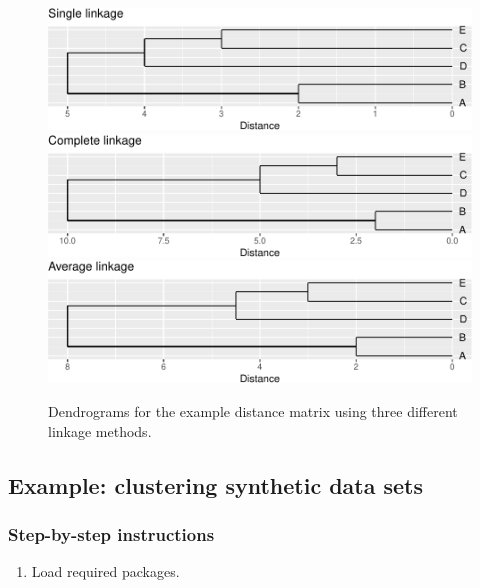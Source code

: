 \documentclass[]{book}
\providecommand{\tightlist}{%
  \setlength{\itemsep}{0pt}\setlength{\parskip}{0pt}}
\theoremstyle{definition}
\theoremstyle{definition}
\theoremstyle{definition}
\theoremstyle{remark}
\begin{document}
\begin{figure}

{\centering \includegraphics[width=1\linewidth]{09-clustering_files/figure-latex/linkageComparison-1} \includegraphics[width=1\linewidth]{09-clustering_files/figure-latex/linkageComparison-2} \includegraphics[width=1\linewidth]{09-clustering_files/figure-latex/linkageComparison-3} 

}

\caption{Dendrograms for the example distance matrix using three different linkage methods. }\label{fig:linkageComparison}
\end{figure}

\subsection{Example: clustering synthetic data
sets}\label{example-clustering-synthetic-data-sets}

\subsubsection{Step-by-step
instructions}\label{step-by-step-instructions}

\begin{enumerate}
\def\labelenumi{\arabic{enumi}.}
\tightlist
\item
  Load required packages.
\end{enumerate}
\end{document}
